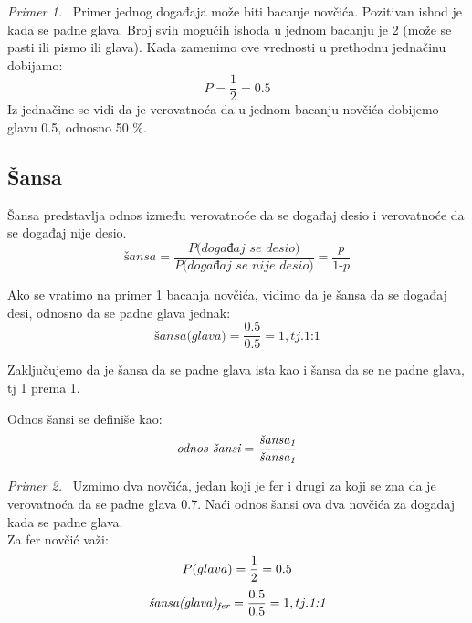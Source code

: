 \documentclass[a4paper,12pt]{report}
\begin{document}
 \textit {Primer 1.} \
Primer jednog događaja može biti bacanje novčića. Pozitivan ishod je kada se padne glava. Broj svih mogućih ishoda u jednom bacanju je 2 (može se pasti ili pismo ili glava). Kada zamenimo ove vrednosti u prethodnu jednačinu dobijamo: 
\begin{equation} \label{eq:2}
	P = \frac{1}{2} = 0.5
 \end{equation}
Iz jednačine se vidi da je verovatnoća da u jednom bacanju novčića dobijemo glavu 0.5, odnosno 50 \%.

\subsection{Šansa}

Šansa predstavlja odnos između verovatnoće da se događaj desio i verovatnoće da se događaj nije desio.
\begin{equation} \label{eq:3}
	\textit{šansa} = \frac{\textit{P(događaj se desio)}}{\textit{P(događaj se nije desio)}} = \frac{\textit{p}}{\textit{1-p}}
 \end{equation}

Ako se vratimo na primer 1 bacanja novčića, vidimo da je šansa da se događaj desi, odnosno da se padne glava jednak: 
\begin{equation} \label{eq:4}
	\textit{šansa(glava)} = \frac{0.5}{0.5} = 1, tj. \textit{1:1}
 \end{equation}
 
 Zaključujemo da je šansa da se padne glava ista kao i šansa da se ne padne glava, tj 1 prema 1. 
 
 Odnos šansi se definiše kao:
 \begin{equation} \label{eq:4}
	\textit{odnos šansi} = \frac{\textit{šansa\textsubscript{1}}}{\textit{šansa\textsubscript{1}}} 
 \end{equation}
 
 \textit {Primer 2.} \ Uzmimo dva novčića, jedan koji je fer i drugi za koji se zna da je verovatnoća da se padne glava 0.7. Naći odnos šansi ova dva novčića za događaj kada se padne glava.\\
 Za fer novčić važi: 
 \begin{equation}
	P(glava) = \frac{1}{2} = 0.5 \\
 \end{equation}
 \begin{equation}
	\textit{šansa(glava)\textsubscript{fer}} = \frac{0.5}{0.5} = 1, tj. \textit{1:1}
 \end{equation}
 
\end{document}
